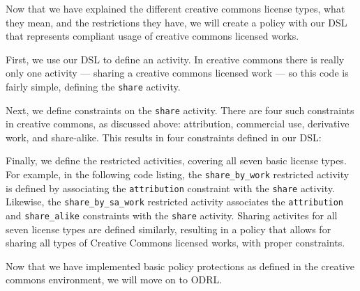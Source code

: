 Now that we have explained the different creative commons license types, what they mean, and the restrictions they have, we will create a policy with our DSL that represents compliant usage of creative commons licensed works.

First, we use our DSL to define an activity.  In creative commons there is really only one activity ---  sharing a creative commons licensed work --- so this code is fairly simple, defining the \texttt{share} activity.



Next, we define constraints on the \texttt{share} activity.  There are four such constraints in creative commons, as discussed above: attribution, commercial use, derivative work, and share-alike.  This results in four constraints defined in our DSL:



Finally, we define the restricted activities, covering all seven basic license types.  For example, in the following code listing, the \texttt{share\_by\_work} restricted activity is defined by associating the \texttt{attribution} constraint with the \texttt{share} activity. Likewise, the \texttt{share\_by\_sa\_work} restricted activity associates the \texttt{attribution} and \texttt{share\_alike} constraints with the \texttt{share} activity.  Sharing activites for all seven license types are defined similarly, resulting in a policy that allows for sharing all types of Creative Commons licensed works, with proper constraints.



Now that we have implemented basic policy protections as defined in the creative commons environment, we will move on to ODRL.